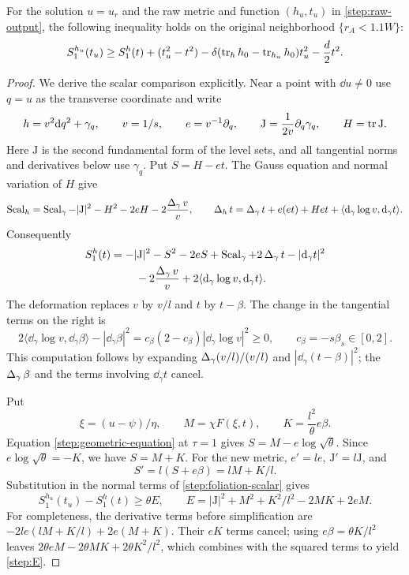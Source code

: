 \begin{lemma}\label{step:raw-estimate}
For the solution $u=u_r$ and the raw metric and function
$(h_u,t_u)$ in \eqref{step:raw-output}, the following inequality holds
on the original neighborhood $\{r_A<1.1W\}$:
\begin{equation}\label{step:raw-inequality}
 S^{h_u}_1(t_u)\ge S^{h}_1(t)+(t_u^2-t^2)
 -\delta(\operatorname{tr}_hh_0-\operatorname{tr}_{h_u}h_0)t_u^2-\frac d2t^2.
\end{equation}
\end{lemma}

\begin{proof}
We derive the scalar comparison explicitly.  Near a point with $\dd u\ne0$
use $q=u$ as the transverse coordinate and write
\[
 h=v^2\mathrm d q^2+\gamma_q,\qquad v=1/s,\qquad
 e=v^{-1}\partial_q,\qquad
 \mathrm J=\frac1{2v}\partial_q\gamma_q,\qquad H=\operatorname{tr}\mathrm J.
\]
Here $\mathrm J$ is the second fundamental form of the level sets,
and all tangential norms and derivatives below use $\gamma_q$.
Put $S=H-et$.  The Gauss equation and normal variation of $H$ give
\[
 \operatorname{Scal}_h=\operatorname{Scal}_{\gamma}-|\mathrm J|^2-H^2-2eH
              -2\frac{\operatorname{\Delta}_{\gamma}v}{v},
 \qquad
 \operatorname{\Delta}_ht=\operatorname{\Delta}_{\gamma}t+e(et)+H et
           +\langle\mathrm d_\gamma\log v,\mathrm d_\gamma t\rangle.
\]
Consequently
\begin{align}
 S^{h}_1(t)
 &=-|\mathrm J|^2-S^2-2eS+\operatorname{Scal}_\gamma
    +2\operatorname{\Delta}_\gamma t-|\mathrm d_\gamma t|^2\notag\\
 &\hspace{8mm}-2\frac{\operatorname{\Delta}_\gamma v}{v}
    +2\langle\mathrm d_\gamma\log v,\mathrm d_\gamma t\rangle.
 \label{step:foliation-scalar}
\end{align}
The deformation replaces $v$ by $v/l$ and $t$ by $t-\beta$.
The change in the tangential terms on the right is
\[
 2\langle\dd_\gamma\log v,\dd_\gamma\beta\rangle
       -|\dd_\gamma\beta|^2
 =c_\beta(2-c_\beta)|\dd_\gamma\log v|^2\ge0,
 \qquad c_\beta=-s\beta_s\in[0,2].
\]
This computation follows by expanding
$\operatorname{\Delta}_\gamma(v/l)/(v/l)$ and $|\dd_\gamma(t-\beta)|^2$;
the $\operatorname{\Delta}_\gamma\beta$ and the terms involving $\dd_\gamma t$ cancel.

Put
\[
 \xi=(u-\psi)/\eta,\qquad
 M=\chi F(\xi,t),\qquad K=\frac{l^2}{\theta}e\beta.
\]
Equation \eqref{step:geometric-equation} at $\tau=1$ gives
$S=M-e\log\sqrt\theta$.  Since $e\log\sqrt\theta=-K$, we have
$S=M+K$.
For the new metric, $e'=le$, $\mathrm J'=l\mathrm J$, and
\[
 S'=l(S+e\beta)=lM+K/l.
\]
Substitution in the normal terms of \cref{step:foliation-scalar} gives
\begin{equation}\label{step:E}
 S^{h_u}_1(t_u)-S^{h}_1(t)\ge\theta E,
 \qquad E=|\mathrm J|^2+M^2+K^2/l^2-2MK+2eM.
\end{equation}
For completeness, the derivative terms before simplification are
$-2le(lM+K/l)+2e(M+K)$.  Their $eK$ terms cancel; using
$e\beta=\theta K/l^2$ leaves $2\theta eM-2\theta MK+
2\theta K^2/l^2$, which combines with the squared terms to yield
\cref{step:E}.


\end{proof}
